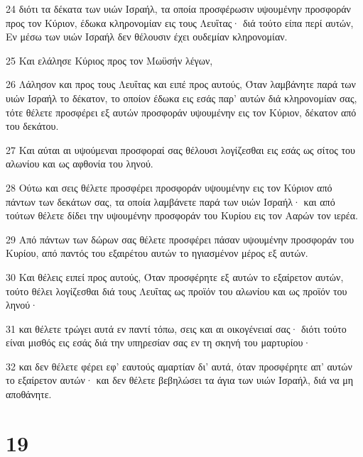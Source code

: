\par 24 διότι τα δέκατα των υιών Ισραήλ, τα οποία προσφέρωσιν υψουμένην προσφοράν προς τον Κύριον, έδωκα κληρονομίαν εις τους Λευΐτας· διά τούτο είπα περί αυτών, Εν μέσω των υιών Ισραήλ δεν θέλουσιν έχει ουδεμίαν κληρονομίαν.
\par 25 Και ελάλησε Κύριος προς τον Μωϋσήν λέγων,
\par 26 Λάλησον και προς τους Λευΐτας και ειπέ προς αυτούς, Όταν λαμβάνητε παρά των υιών Ισραήλ το δέκατον, το οποίον έδωκα εις εσάς παρ' αυτών διά κληρονομίαν σας, τότε θέλετε προσφέρει εξ αυτών προσφοράν υψουμένην εις τον Κύριον, δέκατον από του δεκάτου.
\par 27 Και αύται αι υψούμεναι προσφοραί σας θέλουσι λογίζεσθαι εις εσάς ως σίτος του αλωνίου και ως αφθονία του ληνού.
\par 28 Ούτω και σεις θέλετε προσφέρει προσφοράν υψουμένην εις τον Κύριον από πάντων των δεκάτων σας, τα οποία λαμβάνετε παρά των υιών Ισραήλ· και από τούτων θέλετε δίδει την υψουμένην προσφοράν του Κυρίου εις τον Ααρών τον ιερέα.
\par 29 Από πάντων των δώρων σας θέλετε προσφέρει πάσαν υψουμένην προσφοράν του Κυρίου, από παντός του εξαιρέτου αυτών το ηγιασμένον μέρος εξ αυτών.
\par 30 Και θέλεις ειπεί προς αυτούς, Όταν προσφέρητε εξ αυτών το εξαίρετον αυτών, τούτο θέλει λογίζεσθαι διά τους Λευΐτας ως προϊόν του αλωνίου και ως προϊόν του ληνού·
\par 31 και θέλετε τρώγει αυτά εν παντί τόπω, σεις και αι οικογένειαί σας· διότι τούτο είναι μισθός εις εσάς διά την υπηρεσίαν σας εν τη σκηνή του μαρτυρίου·
\par 32 και δεν θέλετε φέρει εφ' εαυτούς αμαρτίαν δι' αυτά, όταν προσφέρητε απ' αυτών το εξαίρετον αυτών· και δεν θέλετε βεβηλώσει τα άγια των υιών Ισραήλ, διά να μη αποθάνητε.

\chapter{19}

